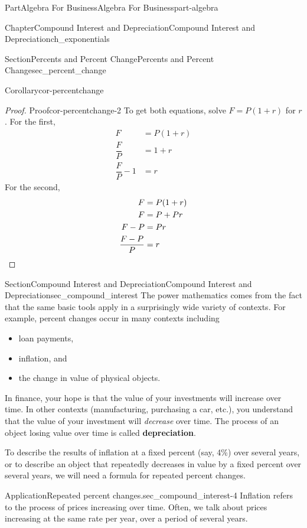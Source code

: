 \documentclass{tufte-book}
\newcommand{\terminology}[1]{\textbf{#1}}
\numberwithin{equation}{chapter}
\newcommand{\qedhere}{\relax}
\newcommand{\amp}{&}
\begin{document}
\begin{partptx}{Part}{Algebra For Business}{}{Algebra For Business}{}{}{part-algebra}
\begin{chapterptx}{Chapter}{Compound Interest and Depreciation}{}{Compound Interest and Depreciation}{}{}{ch_exponentials}
\begin{sectionptx}{Section}{Percents and Percent Change}{}{Percents and Percent Change}{}{}{sec_percent_change}
\begin{corollary}{Corollary}{}{}{cor-percentchange}
\end{corollary}
\begin{proof}{Proof}{}{cor-percentchange-2}
To get both equations, solve \(F = P(1+r)\) for \(r\). For the first,%
\begin{align*}
F \amp = P(1+r) \\
\dfrac{F}{P} \amp = 1 + r\\
\dfrac{F}{P} - 1 \amp = r
\end{align*}
For the second,%
\begin{align*}
F \amp = P(1+r) \\
F \amp = P+ Pr \\
F - P \amp = Pr \\
\dfrac{F - P}{P} \amp = r \qedhere
\end{align*}
%
\end{proof}
\end{sectionptx}
%
%
\typeout{************************************************}
\typeout{************************************************}
%
\begin{sectionptx}{Section}{Compound Interest and Depreciation}{}{Compound Interest and Depreciation}{}{}{sec_compound_interest}
The power mathematics comes from the fact that the same basic tools apply in a surprisingly wide variety of contexts. For example, percent changes occur in many contexts including%
\begin{itemize}[label=\textbullet]
\item{}loan payments,%
\item{}inflation, and%
\item{}the change in value of physical objects.%
\end{itemize}
In finance, your hope is that the value of your investments will increase over time. In other contexts (manufacturing, purchasing a car, etc.), you understand that the value of your investment will \emph{decrease} over time. The process of an object losing value over time is called \terminology{depreciation}.%
\par
To describe the results of inflation at a fixed percent (say, 4\%) over several years, or to describe an object that repeatedly decreases in value by a fixed percent over several years, we will need a formula for repeated percent changes.%
\begin{insight}{Application}{Repeated percent changes.}{sec_compound_interest-4}%
Inflation refers to the process of prices increasing over time. Often, we talk about prices increasing at the same rate per year, over a period of several years.%

\end{insight}
\end{sectionptx}
\end{chapterptx}
\end{partptx}
\end{document}
